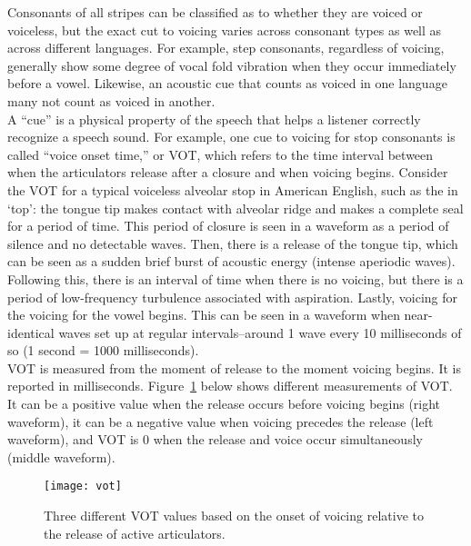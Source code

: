 \documentclass[lab={2},title={Voice Onset Time}]{com310lab}
\begin{document}
\maketitle

\begin{overview}
	Consonants of all stripes can be classified as to whether they are voiced or voiceless, but the exact cut to voicing varies across consonant types as well as across different languages.
	For example, step consonants, regardless of voicing, generally show some degree of vocal fold vibration when they occur immediately before a vowel.
	Likewise, an acoustic cue that counts as voiced in one language many not count as voiced in another.\\

	A ``cue'' is a physical property of the speech that helps a listener correctly recognize a speech sound.
	For example, one cue to voicing for stop consonants is called ``voice onset time,'' or VOT, which refers to the time interval between when the articulators release after a closure and when voicing begins.
	Consider the VOT for a typical voiceless alveolar stop in American English, such as the  in `top':
	the tongue tip makes contact with alveolar ridge and makes a complete seal for a period of time.
	This period of closure is seen in a waveform as a period of silence and no detectable waves.
	Then, there is a release of the tongue tip, which can be seen as a sudden brief burst of acoustic energy (intense aperiodic waves).
	Following this, there is an interval of time when there is no voicing, but there is a period of low-frequency turbulence associated with aspiration.
	Lastly, voicing for the voicing for the vowel begins.
	This can be seen in a waveform when near-identical waves set up at regular intervals--around 1 wave every 10 milliseconds of so (1 second = 1000 milliseconds).\\

	VOT is measured from the moment of release to the moment voicing begins.
	It is reported in milliseconds.
	Figure~\ref{fig:vot} below shows different measurements of VOT\@.
	It can be a positive value when the release occurs before voicing begins (right waveform),
	it can be a negative value when voicing precedes the release (left waveform), and VOT is 0 when the release and voice occur simultaneously (middle waveform).

	\begin{figure}[H]
		\centering
		\texttt{[image: vot]}
		\caption{Three different VOT values based on the onset of voicing relative to the release of active articulators.}
		\label{fig:vot}
	\end{figure}~
\end{overview}
\end{document}
